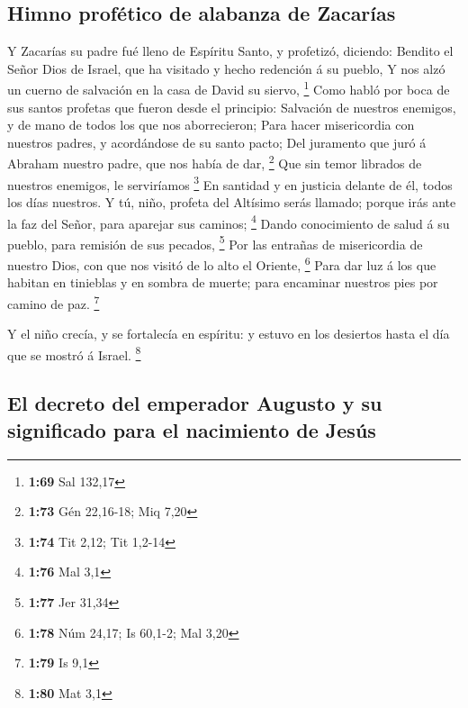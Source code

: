 \hypertarget{himno-profuxe9tico-de-alabanza-de-zacaruxedas}{%
\subsection{Himno profético de alabanza de
Zacarías}\label{himno-profuxe9tico-de-alabanza-de-zacaruxedas}}

 Y Zacarías su padre fué lleno de Espíritu Santo, y
profetizó, diciendo:  Bendito el Señor Dios de Israel,
que ha visitado y hecho redención á su pueblo,  Y nos
alzó un cuerno de salvación en la casa de David su siervo, \footnote{\textbf{1:69}
  Sal 132,17}  Como habló por boca de sus santos profetas
que fueron desde el principio:  Salvación de nuestros
enemigos, y de mano de todos los que nos aborrecieron; 
Para hacer misericordia con nuestros padres, y acordándose de su santo
pacto;  Del juramento que juró á Abraham nuestro padre,
que nos había de dar, \footnote{\textbf{1:73} Gén 22,16-18; Miq 7,20}
 Que sin temor librados de nuestros enemigos, le
serviríamos \footnote{\textbf{1:74} Tit 2,12; Tit 1,2-14}
 En santidad y en justicia delante de él, todos los días
nuestros.  Y tú, niño, profeta del Altísimo serás
llamado; porque irás ante la faz del Señor, para aparejar sus caminos;
\footnote{\textbf{1:76} Mal 3,1}  Dando conocimiento de
salud á su pueblo, para remisión de sus pecados, \footnote{\textbf{1:77}
  Jer 31,34}  Por las entrañas de misericordia de nuestro
Dios, con que nos visitó de lo alto el Oriente, \footnote{\textbf{1:78}
  Núm 24,17; Is 60,1-2; Mal 3,20}  Para dar luz á los que
habitan en tinieblas y en sombra de muerte; para encaminar nuestros pies
por camino de paz. \footnote{\textbf{1:79} Is 9,1}

 Y el niño crecía, y se fortalecía en espíritu: y estuvo
en los desiertos hasta el día que se mostró á Israel. \footnote{\textbf{1:80}
  Mat 3,1}

\hypertarget{el-decreto-del-emperador-augusto-y-su-significado-para-el-nacimiento-de-jesuxfas}{%
\subsection{El decreto del emperador Augusto y su significado para el
nacimiento de
Jesús}\label{el-decreto-del-emperador-augusto-y-su-significado-para-el-nacimiento-de-jesuxfas}}

